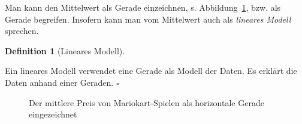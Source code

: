\documentclass[
  letterpaper,
]{scrbook}
\theoremstyle{definition}
\theoremstyle{definition}
\newtheorem{definition}{Definition}[chapter]
\theoremstyle{definition}
\theoremstyle{remark}
\begin{document}
Man kann den Mittelwert als Gerade einzeichnen, s.
Abbildung~\ref{fig-mw2}, bzw. als Gerade begreifen. Insofern kann man
vom Mittelwert auch als \emph{lineares Modell} sprechen.

\begin{definition}[Lineares
Modell]\protect\hypertarget{def-lm}{}\label{def-lm}

Ein lineares Modell verwendet eine Gerade als Modell der Daten. Es
erklärt die Daten anhand einer Geraden. \(\square\)

\end{definition}

\begin{figure}

\begin{minipage}{0.50\linewidth}



\end{minipage}%
%
\begin{minipage}{0.50\linewidth}



\end{minipage}%

\caption{\label{fig-mw2}Der mittlere Preis von Mariokart-Spielen als
horizontale Gerade eingezeichnet}

\end{figure}%
\end{document}

